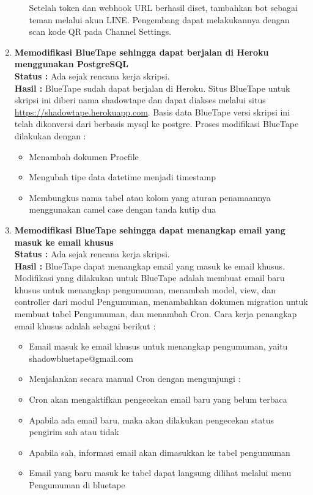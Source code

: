 \documentclass[a4paper,twoside]{article}
\begin{document}
\begin{enumerate}
\begin{itemize}
		Setelah token dan webhook URL berhasil diset, tambahkan bot sebagai teman melalui akun LINE. Pengembang dapat melakukannya dengan scan kode QR pada Channel Settings.
		
	\end{itemize}
		
	\item \textbf{Memodifikasi BlueTape sehingga dapat berjalan di Heroku menggunakan PostgreSQL}\\
	{\bf Status :} Ada sejak rencana kerja skripsi.\\
	{\bf Hasil :} BlueTape sudah dapat berjalan di Heroku. Situs BlueTape untuk skripsi ini diberi nama shadowtape dan dapat diakses melalui situs \url{https://shadowtape.herokuapp.com}. Basis data BlueTape versi skripsi ini telah dikonversi dari berbasis mysql ke postgre. Proses modifikasi BlueTape dilakukan dengan :
	\begin{itemize}
		\item Menambah dokumen Procfile
		\item Mengubah tipe data datetime menjadi timestamp
		\item Membungkus nama tabel atau kolom yang aturan penamaannya menggunakan camel case dengan tanda kutip dua
	\end{itemize}
		
	\item \textbf{Memodifikasi BlueTape sehingga dapat menangkap email yang masuk ke email khusus}\\
	{\bf Status :} Ada sejak rencana kerja skripsi.\\
	{\bf Hasil :} BlueTape dapat menangkap email yang masuk ke email khusus. Modifikasi yang dilakukan untuk BlueTape adalah membuat email baru khusus untuk menangkap pengumuman, menambah model, view, dan controller dari modul Pengumuman, menambahkan dokumen migration untuk membuat tabel Pengumuman, dan menambah Cron. Cara kerja penangkap email khusus adalah sebagai berikut :
	\begin{itemize}
		\item Email masuk ke email khusus untuk menangkap pengumuman, yaitu shadowbluetape@gmail.com
		\item Menjalankan secara manual Cron dengan mengunjungi : 
		\item Cron akan mengaktifkan pengecekan email baru yang belum terbaca
		\item Apabila ada email baru, maka akan dilakukan pengecekan status pengirim sah atau tidak
		\item Apabila sah, informasi email akan dimasukkan ke tabel pengumuman
		\item Email yang baru masuk ke tabel dapat langsung dilihat melalui menu Pengumuman di bluetape
	\end{itemize}
		

\end{enumerate}
\end{document}
